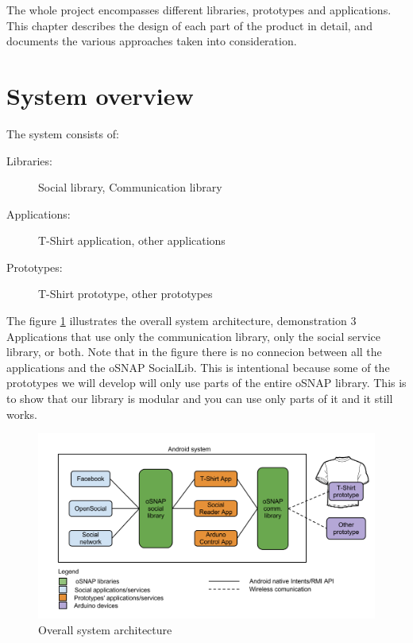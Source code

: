 

The whole project encompasses different libraries, prototypes and applications.
This chapter describes the design of each part of the product in detail,
and documents the various approaches taken into consideration.

\section{System overview}

The system consists of:
\begin{description}
	\item[Libraries:] Social library, Communication library
	\item[Applications:] T-Shirt application, other applications
	\item[Prototypes:] T-Shirt prototype, other prototypes
\end{description}

The figure \ref{fig:design-toplevel} illustrates the overall system architecture, demonstration 3 Applications
that use only the communication library, only the social service library, or both. Note that in the figure there is no
connecion between all the applications and the oSNAP SocialLib. This is intentional because some of the prototypes we
will develop will only use parts of the entire oSNAP library. This is to show that our library is modular and you can use
only parts of it and it still works.

\begin{figure}[h!]
	\centering \includegraphics[scale=0.35]{img/design-toplevel.png}
	\caption{Overall system architecture}
	\label{fig:design-toplevel}
\end{figure}


